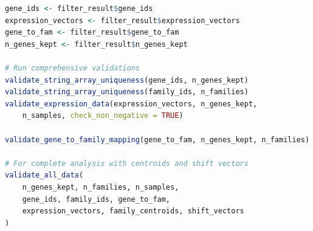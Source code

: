 \documentclass[11pt]{article}
\begin{document}
\begin{enumerate}
\begin{itemize}
\begin{lstlisting}[language=R, caption={R Data Filtering and Validation Workflow}]
gene_ids <- filter_result$gene_ids
expression_vectors <- filter_result$expression_vectors
gene_to_fam <- filter_result$gene_to_fam
n_genes_kept <- filter_result$n_genes_kept

# Run comprehensive validations
validate_string_array_uniqueness(gene_ids, n_genes_kept)
validate_string_array_uniqueness(family_ids, n_families)
validate_expression_data(expression_vectors, n_genes_kept, 
    n_samples, check_non_negative = TRUE)

validate_gene_to_family_mapping(gene_to_fam, n_genes_kept, n_families)

# For complete analysis with centroids and shift vectors
validate_all_data(
	n_genes_kept, n_families, n_samples, 
	gene_ids, family_ids, gene_to_fam,
	expression_vectors, family_centroids, shift_vectors
)
	      	\end{lstlisting}
	      \end{itemize}
\end{enumerate}
\end{document}
